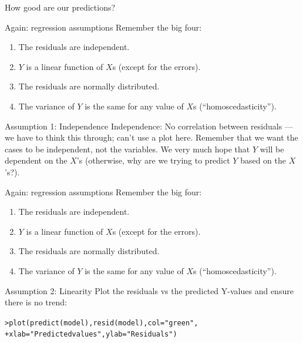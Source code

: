 \documentclass{beamer}\usepackage[]{graphicx}\usepackage[]{color}
\makeatletter
\newcommand{\hlstr}[1]{\textcolor[rgb]{1,0.894,0.71}{#1}}%
\newcommand{\hlstd}[1]{\textcolor[rgb]{1,0.894,0.769}{#1}}%
\newcommand{\hlkwc}[1]{\textcolor[rgb]{0.78,0.941,0.545}{#1}}%
\newcommand{\hlkwd}[1]{\textcolor[rgb]{1,0.78,0.769}{#1}}%
\newenvironment{kframe}{%
 \def\at@end@of@kframe{}%
 \ifinner\ifhmode%
  \def\at@end@of@kframe{\end{minipage}}%
  \begin{minipage}{\columnwidth}%
 \fi\fi%
 \def\FrameCommand##1{\hskip\@totalleftmargin \hskip-\fboxsep
 \colorbox{shadecolor}{##1}\hskip-\fboxsep
     \hskip-\linewidth \hskip-\@totalleftmargin \hskip\columnwidth}%
 \MakeFramed {\advance\hsize-\width
   \@totalleftmargin\z@ \linewidth\hsize
   \@setminipage}}%
 {\par\unskip\endMakeFramed%
 \at@end@of@kframe}
\newenvironment{knitrout}{}{} %
\makeatother
\begin{document}
\begin{darkframes}
\begin{frame}[fragile]{How good are our predictions?}
    \end{frame}



    \begin{frame}{Again: regression assumptions}
      Remember the big four:
      \begin{enumerate}
        \item \alert{The residuals are independent.}
        \item $Y$ is a linear function of $X$s (except for the errors).
        \item The residuals are normally distributed.
        \item The variance of $Y$ is the same for any value of $X$s (``homoscedasticity'').

      \end{enumerate}
    \end{frame}


    \begin{frame}[fragile]{Assumption 1: Independence}
      Independence: No correlation between residuals \pause --- we have to think this through; can't use a plot here.
      \pause
      Remember that we want the \alert{cases} to be independent, not the \alert{variables}. We very much hope that $Y$ will be dependent on the $X$'s (otherwise, why are we trying to predict $Y$ based on the $X$'s?).
    \end{frame}





    \begin{frame}{Again: regression assumptions}
      Remember the big four:
      \begin{enumerate}
        \item The residuals are independent. \greencheckmark
        \item \alert{$Y$ is a linear function of $X$s (except for the errors).}
        \item The residuals are normally distributed.
        \item The variance of $Y$ is the same for any value of $X$s (``homoscedasticity'').
      \end{enumerate}
    \end{frame}



    \begin{frame}[fragile]{Assumption 2: Linearity}
      Plot the residuals vs the \alert{predicted Y-values} and ensure there is no trend:
\begin{knitrout}
\begin{kframe}
\begin{alltt}
\hlstd{> }\hlkwd{plot}\hlstd{(}\hlkwd{predict}\hlstd{(model),} \hlkwd{resid}\hlstd{(model),} \hlkwc{col}\hlstd{=}\hlstr{"green"}\hlstd{,}
\hlstd{+ }  \hlkwc{xlab}\hlstd{=}\hlstr{"Predicted values"}\hlstd{,} \hlkwc{ylab}\hlstd{=}\hlstr{"Residuals"}\hlstd{)}
\end{alltt}
\end{kframe}



\end{knitrout}
\end{frame}
\end{darkframes}
\end{document}
